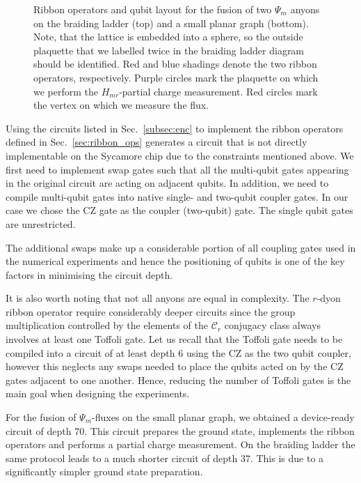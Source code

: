 \documentclass[a4paper,twocolumn,11pt, accepted=2024-06-14]{quantumarticle}
\begin{document}
\begin{figure}
	\caption{Ribbon operators and qubit layout for the fusion of two $\Psi_m$ anyons on the braiding ladder (top) and a small planar graph (bottom). Note, that the lattice is embedded into a sphere, so the outside plaquette that we labelled twice in the braiding ladder diagram should be identified. Red and blue shadings denote the two ribbon operators, respectively. Purple circles mark the plaquette on which we perform the $H_{mr}$-partial charge measurement. Red circles mark the vertex on which we measure the flux.}
	\label{fig:fusion_setup}
\end{figure}

Using the circuits listed in Sec.~\ref{subsec:enc} to implement the ribbon operators defined in Sec.~\ref{sec:ribbon_ops} generates a circuit that is not directly implementable on the Sycamore chip due to the constraints mentioned above. We first need to implement swap gates such that all the multi-qubit gates appearing in the original circuit are acting on adjacent qubits. In addition, we need to compile multi-qubit gates into native single- and two-qubit coupler gates. In our case we chose the CZ gate as the coupler (two-qubit) gate. The single qubit gates are unrestricted.  

The additional swaps make up a considerable portion of all coupling gates used in the numerical experiments and hence the positioning of qubits is one of the key factors in minimising the circuit depth.

It is also worth noting that not all anyons are equal in complexity. The $r$-dyon ribbon operator require considerably deeper circuits since the group multiplication controlled by the elements of the $\mathcal{C}_r$ conjugacy class always involves at least one Toffoli gate. Let us recall that the Toffoli gate needs to be compiled into a circuit of at least depth 6 using the CZ as the two qubit coupler, however this neglects any swaps needed to place the qubits acted on by the CZ gates adjacent to one another. Hence, reducing the number of Toffoli gates is the main goal when designing the experiments.


For the fusion of $\Psi_m$-fluxes on the small planar graph, we obtained a device-ready circuit of depth 70. This circuit prepares the ground state, implements the ribbon operators and performs a partial charge measurement. 
On the braiding ladder the same protocol leads to a much shorter circuit of depth 37. This is due to a significantly simpler ground state preparation.
\end{document}

